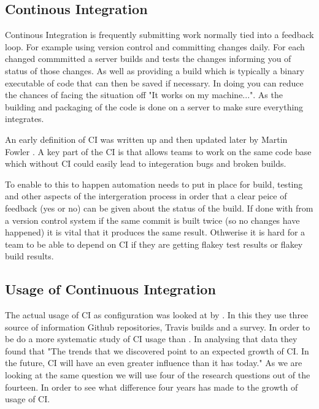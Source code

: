 \documentclass[twoside,12pt,titlepage,a4paper]{article}
\begin{document}
\subsection{Continous Integration}
\vspace*{-0.05in}

Continous Integration is frequently submitting work normally tied into a feedback loop. For example using version control and committing changes daily. For each changed commmitted a server builds and tests the changes informing you of status of those changes. As well as providing a build which is typically a binary executable of code that can then be saved if necessary. In doing you can reduce the chances of facing the situation off "It works on my machine...". As the building and packaging of the code is done on a server to make sure everything integrates.

An early definition of CI was written up and then updated later by Martin Fowler \cite{CI2010_MartinFowler}. A key part of the CI is that allows teams to work on the same code base which without CI could easily lead to integeration bugs and broken builds. 

To enable to this to happen automation needs to put in place for build, testing and other aspects of the intergeration process in order that a clear peice of feedback (yes or no) can be given about the status of the build. If done with from a version control system if the same commit is built twice (so no changes have happened) it is vital that it produces the same result. Othwerise it is hard for a team to be able to depend on CI if they are getting flakey test results or flakey build results.

\vspace*{-0.05in}
\subsection{Usage of Continuous Integration}
\vspace*{-0.05in}

The actual usage of CI as configuration was looked at by \cite{Hilton2016}. In this they use three source of information Github repositories, Travis builds and a survey. In order to be do a more systematic study of CI usage than \cite{Vasilescu2015}. In analysing that data they found that "The trends that we discovered point to an expected growth of CI. In the future, CI will have an even greater influence than it has today." As we are looking at the same question we will use four of the research questions out of the fourteen. In order to see what difference four years has made to the growth of usage of CI.
\end{document}
